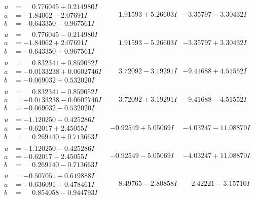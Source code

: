 \documentclass[1p]{elsarticle_modified}
\theoremstyle{definition}
\begin{document}
$$\begin{array}{c|c|c}
\begin{aligned}
u &= \phantom{-}0.776045 + 0.214980 I \\
a &= -1.84062 - 2.07691 I \\
b &= -0.643350 - 0.967561 I\end{aligned}
 & \phantom{-}1.91593 + 5.26603 I & -3.35797 - 3.30432 I \\ \hline\begin{aligned}
u &= \phantom{-}0.776045 - 0.214980 I \\
a &= -1.84062 + 2.07691 I \\
b &= -0.643350 + 0.967561 I\end{aligned}
 & \phantom{-}1.91593 - 5.26603 I & -3.35797 + 3.30432 I \\ \hline\begin{aligned}
u &= \phantom{-}0.832341 + 0.859052 I \\
a &= -0.0133238 + 0.0602746 I \\
b &= -0.069032 + 0.532020 I\end{aligned}
 & \phantom{-}3.72092 - 3.19291 I & -9.41688 + 4.51552 I \\ \hline\begin{aligned}
u &= \phantom{-}0.832341 - 0.859052 I \\
a &= -0.0133238 - 0.0602746 I \\
b &= -0.069032 - 0.532020 I\end{aligned}
 & \phantom{-}3.72092 + 3.19291 I & -9.41688 - 4.51552 I \\ \hline\begin{aligned}
u &= -1.120250 + 0.425286 I \\
a &= -0.62017 + 2.45055 I \\
b &= \phantom{-}0.269140 + 0.713663 I\end{aligned}
 & -0.92549 + 5.05069 I & -4.03247 - 11.08870 I \\ \hline\begin{aligned}
u &= -1.120250 - 0.425286 I \\
a &= -0.62017 - 2.45055 I \\
b &= \phantom{-}0.269140 - 0.713663 I\end{aligned}
 & -0.92549 - 5.05069 I & -4.03247 + 11.08870 I \\ \hline\begin{aligned}
u &= -0.507051 + 0.619888 I \\
a &= -0.636091 - 0.478461 I \\
b &= \phantom{-}0.854058 - 0.944793 I\end{aligned}
 & \phantom{-}8.49765 - 2.80858 I & \phantom{-}2.42221 - 3.15710 I \\ \hline\begin{aligned}

\end{aligned}
\end{array}$$
\end{document}
